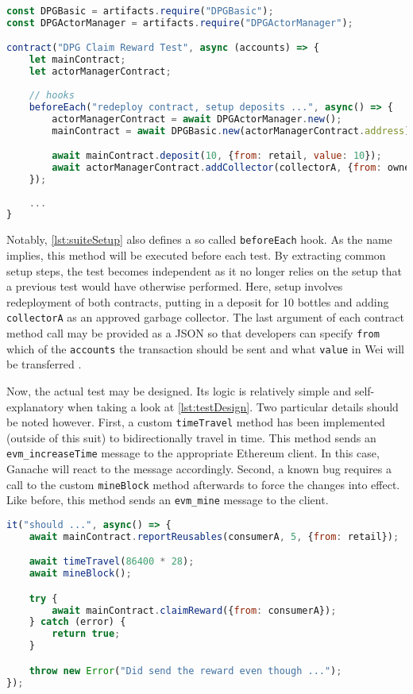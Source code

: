 \begin{lstlisting}[language=JavaScript, caption=Setup of test suite, label=lst:suiteSetup]
const DPGBasic = artifacts.require("DPGBasic");
const DPGActorManager = artifacts.require("DPGActorManager");

contract("DPG Claim Reward Test", async (accounts) => {
	let mainContract;
	let actorManagerContract;
	
	// hooks
	beforeEach("redeploy contract, setup deposits ...", async() => {
		actorManagerContract = await DPGActorManager.new();
		mainContract = await DPGBasic.new(actorManagerContract.address);

		await mainContract.deposit(10, {from: retail, value: 10});
		await actorManagerContract.addCollector(collectorA, {from: owner});
	});
	
	...
}
\end{lstlisting}

Notably, \autoref{lst:suiteSetup} also defines a so called \texttt{beforeEach} hook. As the name implies, this method will be executed before each test. By extracting common setup steps, the test becomes independent as it no longer relies on the setup that a previous test would have otherwise performed. Here, setup involves redeployment of both contracts, putting in a deposit for 10 bottles and adding \texttt{collectorA} as an approved garbage collector. The last argument of each contract method call may be provided as a JSON so that developers can specify \texttt{from} which of the \texttt{accounts} the transaction should be sent and what \texttt{value} in Wei will be transferred \cite[Interacting With Your Contracts]{truffleSuite}.

Now, the actual test may be designed. Its logic is relatively simple and self-explanatory when taking a look at \autoref{lst:testDesign}. Two particular details should be noted however. First, a custom \texttt{timeTravel} method has been implemented (outside of this suit) to bidirectionally travel in time. This method sends an \texttt{evm\_increaseTime} message to the appropriate Ethereum client. In this case, Ganache will react to the message accordingly. Second, a known bug requires a call to the custom \texttt{mineBlock} method afterwards to force the changes into effect. Like before, this method sends an \texttt{evm\_mine} message to the client.

\pagebreak

\begin{lstlisting}[language=JavaScript, caption=Example test case, label=lst:testDesign]
it("should ...", async() => {
    await mainContract.reportReusables(consumerA, 5, {from: retail});

    await timeTravel(86400 * 28);
    await mineBlock();

    try {
        await mainContract.claimReward({from: consumerA});
    } catch (error) {
        return true;
    }

    throw new Error("Did send the reward even though ...");
});
\end{lstlisting}

